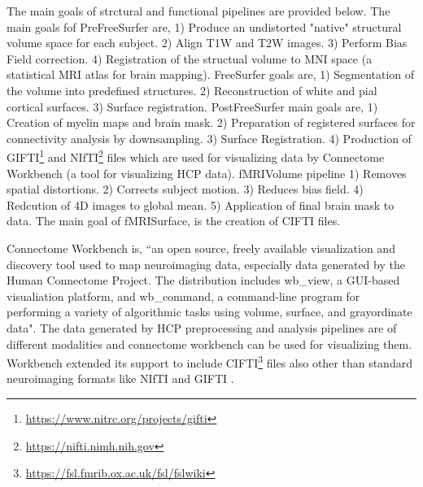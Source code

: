 The main goals of strctural and functional pipelines \cite{Gla13} are provided below. The main goals fof PreFreeSurfer are, 1) Produce an undistorted "native" structural volume space for each subject. 2) Align T1W and T2W images. 3) Perform Bias Field correction. 4) Registration of the structual volume to MNI space (a statistical MRI atlas for brain mapping). FreeSurfer goals are, 1) Segmentation of the volume into predefined structures. 2) Reconstruction of white and pial cortical surfaces. 3) Surface registration. PostFreeSurfer main goals are, 1) Creation of myelin maps and brain mask. 2) Preparation of registered surfaces for connectivity analysis by downsampling. 3) Surface Registration. 4) Production of GIFTI\footnote{\url{https://www.nitrc.org/projects/gifti}} and NIfTI\footnote{\url{https://nifti.nimh.nih.gov}} files which are used for visualizing data by Connectome Workbench (a tool for visualizing HCP data). fMRIVolume pipeline 1) Removes spatial distortions. 2) Corrects subject motion. 3) Reduces bias field. 4) Redcution of 4D images to global mean. 5) Application of final brain mask to data. The main goal of fMRISurface, is the creation of CIFTI files.

Connectome Workbench \cite{wb_workbench} is, ``an open source, freely available visualization and discovery tool used to map neuroimaging data, especially data generated by the Human Connectome Project. The distribution includes wb\_view, a GUI-based visualiation platform, and wb\_command, a command-line program for performing a variety of algorithmic tasks using volume, surface, and grayordinate data". The data generated by HCP preprocessing and analysis pipelines are of different modalities and connectome workbench can be used for visualizing them. Workbench extended its support to include CIFTI\footnote{\url{https://fsl.fmrib.ox.ac.uk/fsl/fslwiki}} files also other than standard neuroimaging formats like NIfTI and GIFTI \cite{journals/neuroimage/MarcusHSJWGBABRHHHOMHHRHCSECE13}.
 

